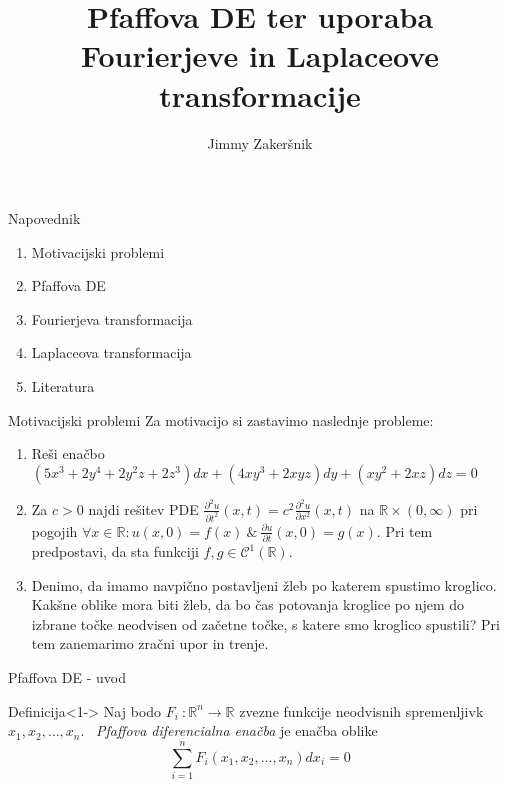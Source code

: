 \documentclass[t, 8pt]{beamer} %
\title[Pfaffove DE in uporaba FT ter LT]{Pfaffova DE ter uporaba Fourierjeve in Laplaceove transformacije}
\author{Jimmy Zakeršnik}
\institute[FNM]{Fakulteta za naravoslovje in matematiko}
\newcommand{\mth}[1]{\ensuremath{\mathbb{#1}}}
\newcommand{\R}{\mth{R}}
\newcommand{\pojem}[1]{\emph{#1}}
\newcommand{\map}[3]{\ensuremath{{#1}~: {#2} \rightarrow {#3}}}
\newcommand{\fillblack}[1]{
	\begin{tikzpicture}[remember picture, overlay]
		\node [shift={(0 cm,0cm)}]  at (current page.south west)
		{%
			\begin{tikzpicture}[remember picture, overlay] at (current page.south west)
				\draw [fill=black] (0, 0) -- (0,#1 \paperheight) --
				(\paperwidth,#1 \paperheight) -- (\paperwidth,0) -- cycle ;
			\end{tikzpicture}
		};
		\draw (current page.north west) rectangle (current page.south east);
	\end{tikzpicture}
}
\begin{document}
	
	\begin{frame}
		\maketitle
	\end{frame}
	
	\begin{frame}{Napovednik}
		\begin{enumerate}
			\item Motivacijski problemi
			\item Pfaffova DE
			\item Fourierjeva transformacija
			\item Laplaceova transformacija
			\item Literatura
		\end{enumerate}
		
	\end{frame}
	
	\begin{frame}{Motivacijski problemi}
		Za motivacijo si zastavimo naslednje probleme:
		\begin{enumerate}
			\item Reši enačbo $(5x^3 + 2y^4 + 2y^2z + 2z^3)dx + (4xy^3 + 2xyz)dy + (xy^2 + 2xz)dz = 0$
			\item Za $c>0$ najdi rešitev PDE $\frac{\partial^2 u}{\partial t^2}(x, t) = c^2\frac{\partial^2 u}{\partial x^2}(x, t)$ na $\R\times (0, \infty)$ pri pogojih $\forall x\in \R: u(x, 0) = f(x)~\&~\frac{\partial u}{\partial t}(x, 0) = g(x)$. Pri tem predpostavi, da sta funkciji $f, g \in \mathcal{C}^1(\R)$.
			\item Denimo, da imamo navpično postavljeni žleb po katerem spustimo kroglico. Kakšne oblike mora biti žleb, da bo čas potovanja kroglice po njem do izbrane točke neodvisen od začetne točke, s katere smo kroglico spustili? Pri tem zanemarimo zračni upor in trenje.
		\end{enumerate}
		
	\end{frame}
	
	\begin{frame}{Pfaffova DE - uvod}
		
		\begin{block}{Definicija}<1->
			Naj bodo $\map{F_i}{\R^n}{\R}$ zvezne funkcije neodvisnih spremenljivk $x_1, x_2, \ldots, x_n$. ~\pojem{Pfaffova diferencialna enačba} je enačba oblike $$\sum_{i = 1}^{n}F_i(x_1, x_2, \ldots, x_n) dx_i = 0$$
		\end{block}
		
	\end{frame}
	
\end{document}
